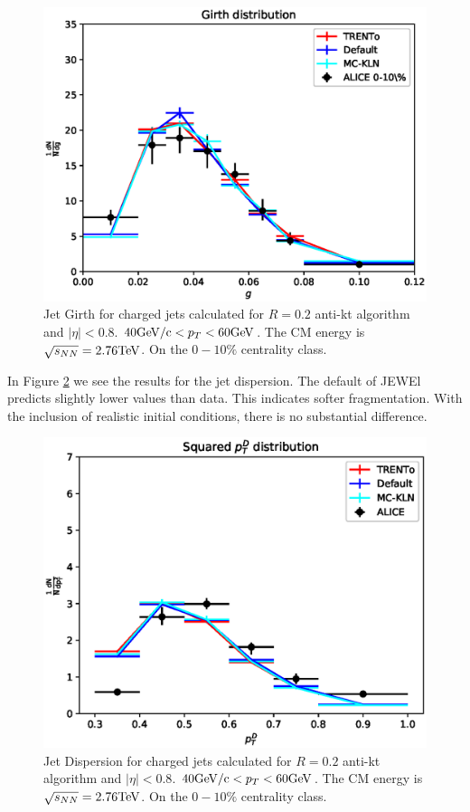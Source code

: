 \begin{figure}
\includegraphics[width=1.0\textwidth]{images/My_Angularity_3.eps}
\caption[Jet Girth with realistic IC]{Jet Girth for charged jets calculated for $R=0.2$ anti-kt algorithm and $|\eta|<0.8$. $40 {\rm GeV/c} < p_T < 60 {\rm GeV}$. The CM energy is $\sqrt{s_{NN}}= 2.76 {\rm TeV}$. On the $0-10\%$ centrality class.}
\label{jet_girth_ic}
\end{figure}

In Figure \ref{jet_dispersion_ic} we see the results for the jet dispersion. The default of JEWEl predicts slightly lower values than data. This indicates softer fragmentation. With the inclusion of realistic initial conditions, there is no substantial difference.

\begin{figure}
\includegraphics[width=1.0\textwidth]{images/Squared_3.eps}
\caption[Jet $p_D^T$ with realistic IC]{Jet Dispersion for charged jets calculated for $R=0.2$ anti-kt algorithm and $|\eta|<0.8$. $40 {\rm GeV/c} < p_T < 60 {\rm GeV}$. The CM energy is $\sqrt{s_{NN}}= 2.76 {\rm TeV}$. On the $0-10\%$ centrality class.}
\label{jet_dispersion_ic}
\end{figure}

